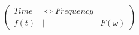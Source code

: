 \documentclass[preview]{standalone}
\begin{document}
\begin{align*}
\left( \begin{array}{cl} Time & \Longleftrightarrow Frequency \\ f(t) & | & F(\omega) \end{array} \right)
\end{align*}
\end{document}
